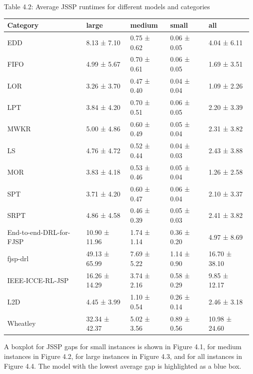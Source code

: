 \begin{table}
    Table 4.2: Average JSSP runtimes for different models and categories\\
    \vspace{1mm}
    \label{table:4.2}
    \small
    \begin{tabular}{lllll}
        \toprule
        Category & large & medium & small & all \\
        \midrule
        EDD & 8.13 ± 7.10 & 0.75 ± 0.62 & 0.06 ± 0.05 & 4.04 ± 6.11 \\
        FIFO & 4.99 ± 5.67 & 0.70 ± 0.61 & 0.06 ± 0.05 & 1.69 ± 3.51 \\
        LOR & 3.26 ± 3.70 & 0.47 ± 0.40 & 0.04 ± 0.04 & 1.09 ± 2.26 \\
        LPT & 3.84 ± 4.20 & 0.70 ± 0.51 & 0.06 ± 0.05 & 2.20 ± 3.39 \\
        MWKR & 5.00 ± 4.86 & 0.60 ± 0.49 & 0.05 ± 0.04 & 2.31 ± 3.82 \\
        LS & 4.76 ± 4.72 & 0.52 ± 0.44 & 0.04 ± 0.03 & 2.43 ± 3.88 \\
        MOR & 3.83 ± 4.18 & 0.53 ± 0.46 & 0.05 ± 0.04 & 1.26 ± 2.58 \\
        SPT & 3.71 ± 4.20 & 0.60 ± 0.47 & 0.06 ± 0.04 & 2.10 ± 3.37 \\
        SRPT & 4.86 ± 4.58 & 0.46 ± 0.39 & 0.05 ± 0.03 & 2.41 ± 3.82 \\
        End-to-end-DRL-for-FJSP & 10.90 ± 11.96 & 1.74 ± 1.14 & 0.36 ± 0.20 & 4.97 ± 8.69 \\
        fjsp-drl & 49.13 ± 65.99 & 7.69 ± 5.22 & 1.14 ± 0.90 & 16.70 ± 38.10 \\
        IEEE-ICCE-RL-JSP & 16.26 ± 14.29 & 3.74 ± 2.16 & 0.58 ± 0.29 & 9.85 ± 12.17 \\
        L2D & 4.45 ± 3.99 & 1.10 ± 0.54 & 0.26 ± 0.14 & 2.46 ± 3.18 \\
        Wheatley & 32.34 ± 42.37 & 5.02 ± 3.56 & 0.89 ± 0.56 & 10.98 ± 24.60 \\
        \bottomrule
        \end{tabular}        
\end{table}

A boxplot for JSSP gaps for small instances is shown in Figure 4.1, for medium instances in Figure 4.2, for large instances in Figure 4.3, and for all instances in Figure 4.4. The model with the lowest average gap is highlighted as a blue box.

